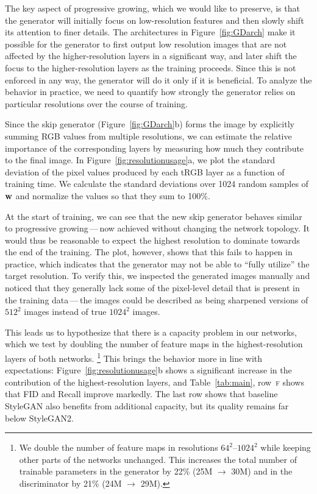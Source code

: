 \documentclass[10pt,twocolumn,letterpaper]{article}
\newcommand{\arch}[1]{\textsc{#1}}
\newcommand{\FINAL}[2][]{#2} %
\newcommand{\ww}{{\bf w}}
\begin{document}
The key aspect of progressive growing, which we would like to preserve, is that the generator will initially focus on low-resolution features and then slowly shift its attention to finer details.
The architectures in Figure~\ref{fig:GDarch} make it possible for the generator to first output low resolution images that are not affected by the higher-resolution layers in a significant way, and later shift the focus to the higher-resolution layers as the training proceeds. Since this is not enforced in any way, the generator will do it only if it is beneficial. To analyze the behavior in practice, we need to quantify how strongly the generator relies on particular resolutions over the course of training.

Since the skip generator (Figure~\ref{fig:GDarch}b) forms the image by explicitly summing RGB values from multiple resolutions, we can estimate the relative importance of the corresponding layers by measuring how much they contribute to the final image. In Figure~\ref{fig:resolutionusage}a, we plot the standard deviation of the pixel values produced by each tRGB layer as a function of training time. We calculate the standard deviations over 1024 random samples of $\ww$ and normalize the values so that they sum to 100\%.

At the start of training, we can see that the new skip generator behaves similar to progressive growing\,---\,now achieved without changing the network topology.
It would thus be reasonable to expect the highest resolution to dominate towards the end of the training. The plot, however, shows that this fails to happen in practice, which indicates that the generator may not be able to ``fully utilize'' the target resolution. To verify this, we inspected the generated images manually and noticed that they generally lack some of the pixel-level detail that is present in the training data\,---\,the images could be described as being sharpened versions of $512^2$ images instead of true $1024^2$ images.

This leads us to hypothesize that there is a capacity problem in our networks, which we test by doubling the number of feature maps in the highest-resolution layers of both networks.%
\footnote{We double the number of feature maps in resolutions $64^2$--$1024^2$ while keeping other parts of the networks unchanged. This increases the total number of trainable parameters in the generator by 22\% (25M $\rightarrow$ 30M) and in the discriminator by 21\% (24M $\rightarrow$ 29M).}
This brings the behavior more in line with expectations: Figure~\ref{fig:resolutionusage}b shows a significant increase in the contribution of the highest-resolution layers, and Table~\ref{tab:main}, row~\arch{f} shows that FID and Recall improve markedly. 
\FINAL{The last row shows that baseline StyleGAN also benefits from additional capacity, but its quality remains far below StyleGAN2.}
\end{document}
